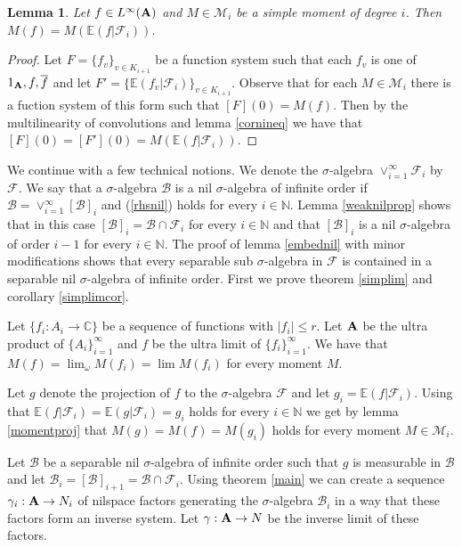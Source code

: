 \documentclass [11pt] {article}
\newtheorem{lemma}{Lemma}[section]
\def\bA{{\bf A}}
\begin{document}
\begin{lemma} Let $f\in L^\infty(\bA)$ and $M\in\mathcal{M}_i$ be a simple moment of degree $i$. Then $M(f)=M(\mathbb{E}(f|\mathcal{F}_i))$.
\end{lemma}

\begin{proof}\label{momentproj} Let $F=\{f_v\}_{v\in K_{i+1}}$ be a function system such that each $f_v$ is one of $1_{\bA},f,\overline{f}$ and let $F'=\{\mathbb{E}(f_v|\mathcal{F}_i)\}_{v\in K_{i+1}}$. Observe that for each $M\in\mathcal{M}_i$ there is a fuction system of this form such that $[F](0)=M(f)$. Then by the multilinearity of convolutions and lemma \ref{cornineq} we have that $[F](0)=[F'](0)=M(\mathbb{E}(f|\mathcal{F}_i))$.
\end{proof}

We continue with a few technical notions. We denote the $\sigma$-algebra $\vee_{i=1}^\infty\mathcal{F}_i$ by $\mathcal{F}$. We say that a $\sigma$-algebra $\mathcal{B}$ is a nil $\sigma$-algebra of infinite order if $\mathcal{B}=\vee_{i=1}^\infty[\mathcal{B}]_i$ and (\ref{rhsnil}) holds for every $i\in\mathbb{N}$.
Lemma \ref{weaknilprop} shows that in this case $[\mathcal{B}]_i=\mathcal{B}\cap\mathcal{F}_i$ for every $i\in\mathbb{N}$ and that $[\mathcal{B}]_i$ is a nil $\sigma$-algebra of order $i-1$ for every $i\in\mathbb{N}$.
The proof of lemma \ref{embednil} with minor modifications shows that every separable sub $\sigma$-algebra in $\mathcal{F}$ is contained in a separable nil $\sigma$-algebra of infinite order. 
First we prove theorem \ref{simplim} and corollary \ref{simplimcor}.

\bigskip

Let $\{f_i:A_i\rightarrow\mathbb{C}\}$ be a sequence of functions with $|f_i|\leq r$.
Let $\bA$ be the ultra product of $\{A_i\}_{i=1}^\infty$ and $f$ be the ultra limit of $\{f_i\}_{i=1}^\infty$.
We have that $M(f)=\lim_\omega M(f_i)=\lim M(f_i)$ for every moment $M$.

Let $g$ denote the projection of $f$ to the $\sigma$-algebra $\mathcal{F}$ and let $g_i=\mathbb{E}(f|\mathcal{F}_i)$. 
Using that $\mathbb{E}(f|\mathcal{F}_i)=\mathbb{E}(g|\mathcal{F}_i)=g_i$ holds for every $i\in\mathbb{N}$ we get by lemma \ref{momentproj} that $M(g)=M(f)=M(g_i)$ holds for every moment $M\in\mathcal{M}_i$.

Let $\mathcal{B}$ be a separable nil $\sigma$-algebra of infinite order such that $g$ is measurable in $\mathcal{B}$ and let $\mathcal{B}_i=[\mathcal{B}]_{i+1}=\mathcal{B}\cap\mathcal{F}_i$.
Using theorem \ref{main} we can create a sequence $\gamma_i:\bA\rightarrow N_i$ of nilspace factors generating the $\sigma$-algebra $\mathcal{B}_i$ in a way that these factors form an inverse system.
Let $\gamma:\bA\rightarrow N$ be the inverse limit of these factors. 
\end{document}
